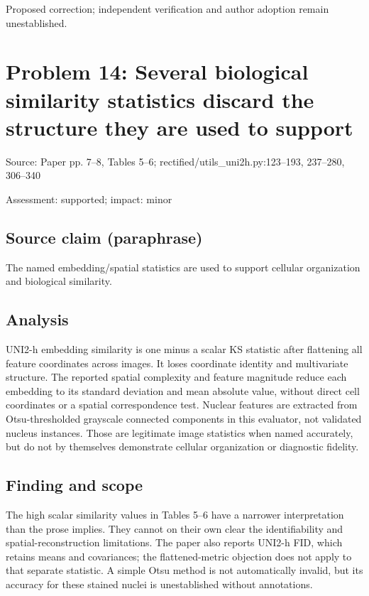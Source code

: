\documentclass[11pt]{article}
\begin{document}
Proposed correction; independent verification and author adoption remain unestablished.

\section*{Problem 14: Several biological similarity statistics discard the structure they are used to support}

Source: Paper pp. 7–8, Tables 5–6; rectified/utils\_uni2h.py:123–193, 237–280, 306–340

Assessment: supported; impact: minor

\subsection*{Source claim (paraphrase)}

The named embedding/spatial statistics are used to support cellular organization and biological similarity.

\subsection*{Analysis}

UNI2-h embedding similarity is one minus a scalar KS statistic after flattening all feature coordinates across images. It loses coordinate identity and multivariate structure. The reported spatial complexity and feature magnitude reduce each embedding to its standard deviation and mean absolute value, without direct cell coordinates or a spatial correspondence test. Nuclear features are extracted from Otsu-thresholded grayscale connected components in this evaluator, not validated nucleus instances. Those are legitimate image statistics when named accurately, but do not by themselves demonstrate cellular organization or diagnostic fidelity.

\subsection*{Finding and scope}

The high scalar similarity values in Tables 5–6 have a narrower interpretation than the prose implies. They cannot on their own clear the identifiability and spatial-reconstruction limitations. The paper also reports UNI2-h FID, which retains means and covariances; the flattened-metric objection does not apply to that separate statistic. A simple Otsu method is not automatically invalid, but its accuracy for these stained nuclei is unestablished without annotations.
\end{document}
